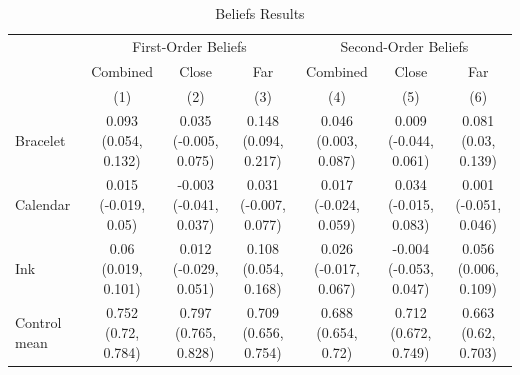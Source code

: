 \documentclass[
]{article}
\begin{document}
\begin{table}
\centering
\caption{\label{tab:beliefs}Beliefs Results}
\centering
\begin{tabular}[t]{lcccccc}
\toprule
\multicolumn{1}{c}{ } & \multicolumn{3}{c}{First-Order Beliefs} & \multicolumn{3}{c}{Second-Order Beliefs} \\
\cmidrule(l{3pt}r{3pt}){2-4} \cmidrule(l{3pt}r{3pt}){5-7}
\multicolumn{1}{c}{ } & \multicolumn{1}{c}{Combined} & \multicolumn{1}{c}{Close} & \multicolumn{1}{c}{Far} & \multicolumn{1}{c}{Combined} & \multicolumn{1}{c}{Close} & \multicolumn{1}{c}{Far} \\
 & (1) & (2) & (3) & (4) & (5) & (6)\\
\midrule
Bracelet & \makecell[c]{0.093\\(0.054, 0.132)} & \makecell[c]{0.035\\(-0.005, 0.075)} & \makecell[c]{0.148\\(0.094, 0.217)} & \makecell[c]{0.046\\(0.003, 0.087)} & \makecell[c]{0.009\\(-0.044, 0.061)} & \makecell[c]{0.081\\(0.03, 0.139)}\\
\addlinespace \addlinespace \addlinespace
Calendar & \makecell[c]{0.015\\(-0.019, 0.05)} & \makecell[c]{-0.003\\(-0.041, 0.037)} & \makecell[c]{0.031\\(-0.007, 0.077)} & \makecell[c]{0.017\\(-0.024, 0.059)} & \makecell[c]{0.034\\(-0.015, 0.083)} & \makecell[c]{0.001\\(-0.051, 0.046)}\\
\addlinespace \addlinespace \addlinespace
Ink & \makecell[c]{0.06\\(0.019, 0.101)} & \makecell[c]{0.012\\(-0.029, 0.051)} & \makecell[c]{0.108\\(0.054, 0.168)} & \makecell[c]{0.026\\(-0.017, 0.067)} & \makecell[c]{-0.004\\(-0.053, 0.047)} & \makecell[c]{0.056\\(0.006, 0.109)}\\
\addlinespace \addlinespace \addlinespace
Control mean & \makecell[c]{0.752\\(0.72, 0.784)} & \makecell[c]{0.797\\(0.765, 0.828)} & \makecell[c]{0.709\\(0.656, 0.754)} & \makecell[c]{0.688\\(0.654, 0.72)} & \makecell[c]{0.712\\(0.672, 0.749)} & \makecell[c]{0.663\\(0.62, 0.703)}\\
\bottomrule
\end{tabular}
\end{table}
\end{document}
